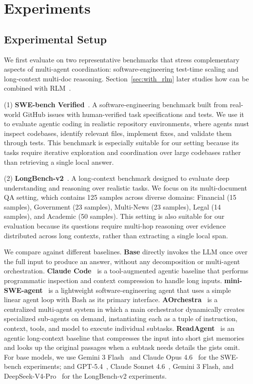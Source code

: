 \section{Experiments}

\subsection{Experimental Setup}\label{sec:setup}
We first evaluate \toolName{} on two representative benchmarks that stress complementary aspects of multi-agent coordination: software-engineering test-time scaling and long-context multi-doc reasoning. Section~\ref{sec:with_rlm} later studies how \toolName{} can be combined with RLM~\citep{zhang2025recursive}.

(1) \textbf{SWE-bench Verified}~\citep{jimenez2024swebench}. A software-engineering benchmark built from real-world GitHub issues with human-verified task specifications and tests. We use it to evaluate agentic coding in realistic repository environments, where agents must inspect codebases, identify relevant files, implement fixes, and validate them through tests. This benchmark is especially suitable for our setting because its tasks require iterative exploration and coordination over large codebases rather than retrieving a single local answer.

(2) \textbf{LongBench-v2}~\citep{bai2025longbench}. A long-context benchmark designed to evaluate deep understanding and reasoning over realistic tasks. We focus on its multi-document QA setting, which contains 125 samples across diverse domains: Financial (15 samples), Government (23 samples), Multi-News (23 samples), Legal (14 samples), and Academic (50 samples). This setting is also suitable for our evaluation because its questions require multi-hop reasoning over evidence distributed across long contexts, rather than extracting a single local span.


We compare \toolName{} against different baselines. 
\textbf{Base} directly invokes the LLM once over the full input to produce an answer, without any decomposition or multi-agent orchestration. 
\textbf{Claude Code}~\citep{anthropic_claude_code_2026} is a tool-augmented agentic baseline that performs programmatic inspection and context compression to handle long inputs. \textbf{mini-SWE-agent}~\citep{yang2024sweagent} is a lightweight software-engineering agent that uses a simple linear agent loop with Bash as its primary interface.
\textbf{AOrchestra}~\citep{ruan2026aorchestra} is a centralized multi-agent system in which a main orchestrator dynamically creates specialized sub-agents on demand, instantiating each as a tuple of instruction, context, tools, and model to execute individual subtasks. 
\textbf{ReadAgent}~\citep{lee2024human} is an agentic long-context baseline that compresses the input into short gist memories and looks up the original passages when a subtask needs details the gists omit. For base models, we use Gemini 3 Flash~\citep{doshi2025gemini3flash} and Claude Opus 4.6~\citep{anthropic2026opus46} for the SWE-bench experiments; and GPT-5.4~\citep{openai2026gpt54}, Claude Sonnet 4.6~\citep{anthropic2025claude46sonnet}, Gemini 3 Flash, and DeepSeek-V4-Pro~\citep{deepseekai2026deepseekv4} for the LongBench-v2 experiments. 

